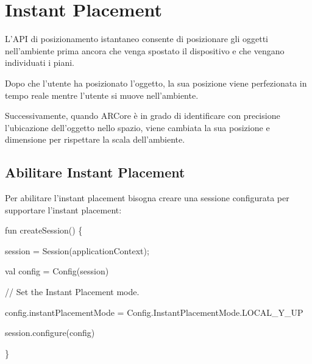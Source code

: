 \documentclass[crop=false, class=book]{standalone}
\begin{document}
	\chapter{Instant Placement}
	L'API di posizionamento istantaneo consente di posizionare gli oggetti nell’ambiente prima ancora che venga spostato il dispositivo e che vengano individuati i piani.
	
Dopo che l’utente ha posizionato l’oggetto, la sua posizione viene perfezionata in tempo reale mentre l’utente si muove nell’ambiente.

Successivamente, quando ARCore è in grado di identificare con precisione l’ubicazione dell’oggetto nello spazio, viene cambiata la sua posizione e dimensione per rispettare la scala dell’ambiente.

\section{Abilitare Instant Placement}
Per abilitare l’instant placement bisogna creare una sessione configurata per supportare l’instant placement:

\begin{center}
	\begin{minipage}{0.95\textwidth}
	
	fun createSession() \{
	
  session = Session(applicationContext);
  
  val config = Config(session)
  
  // Set the Instant Placement mode.
  
  config.instantPlacementMode = Config.InstantPlacementMode.LOCAL\_Y\_UP
  
  session.configure(config)
  
\}

	
	\end{minipage}
\end{center}
\end{document}
